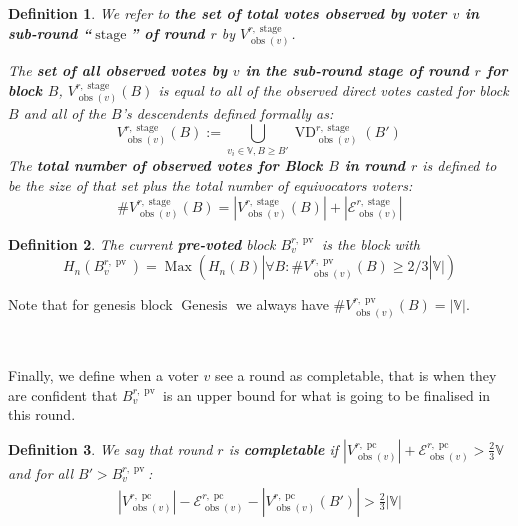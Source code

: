 \documentclass{book}
\newcommand{\assign}{:=}
\newcommand{\nosymbol}{}
\newcommand{\tmop}[1]{\ensuremath{\operatorname{#1}}}
\newcommand{\tmstrong}[1]{\textbf{#1}}
\newcommand{\tmtextbf}[1]{{\bfseries{#1}}}
\newtheorem{definition}{Definition}
\providecommand{\nosymbol}{}
\providecommand{\tmop}[1]{\ensuremath{\mathrm{#1}}}
\providecommand{\tmstrong}[1]{\tmtextbf{#1}}
\providecommand{\tmtextbf}[1]{\tmtextbf{#1}}
\newtheorem{definition}{Definition}
\begin{document}
\begin{definition}
  We refer to {\tmstrong{the set of total votes observed by voter $v$ in
  sub-round ``$\tmop{stage}$'' of round $r$}} by {\tmstrong{$V^{r,
  \tmop{stage}}_{\tmop{obs} (v)}^{\nosymbol}_{\nosymbol}$}}.
  
  The {\tmstrong{set of all observed votes by $v$ in the sub-round stage of
  round $r$ for block $B$}}, {\tmstrong{$V^{r, \tmop{stage}}_{\tmop{obs} (v)}
  (B)$}} is equal to all of the observed direct votes casted for block $B$ and
  all of the $B$'s descendents defined formally as:
  \[ V^{r, \tmop{stage}}_{\tmop{obs} (v)} (B) \assign \bigcup_{v_i \in
     \mathbb{V}, B \geqslant B'} \tmop{VD}^{r, \tmop{stage}}_{\tmop{obs} (v)}
     (B')_{\nosymbol}^{\nosymbol}_{\nosymbol} \]
  The {\tmstrong{total number of observed votes for Block $B$ in round $r$}}
  is defined to be the size of that set plus the total number of equivocators
  voters:
  \[ \#V^{r, \tmop{stage}}_{\tmop{obs} (v)} (B) = |V^{r,
     \tmop{stage}}_{\tmop{obs} (v)} (B) | + | \mathcal{E}^{r,
     \tmop{stage}}_{\tmop{obs} (v)} | \]
\end{definition}

\begin{definition}
  The current {\tmstrong{pre-voted}} block $B^{r, \tmop{pv}}_v$ is the block
  with
  \[ H_n (B^{r, \tmop{pv}}_v) = \tmop{Max} (H_n (B) | \forall B :
     \#V_{\tmop{obs} (v)}^{r, \tmop{pv}} (B) \geqslant 2 / 3|\mathbb{V}|) \]
\end{definition}

Note that for genesis block $\tmop{Genesis}$ we always have $\#V_{\tmop{obs}
(v)}^{r, \tmop{pv}} (B) = | \mathbb{V} |$.

\

Finally, we define when a voter $v$ see a round as completable, that is when
they are confident that $B_v^{r, \tmop{pv}}$ is an upper bound for what is
going to be finalised in this round. \

\begin{definition}
  \label{defn-grandpa-completable}We say that round $r$ is
  {\tmstrong{completable}} if $|V^{r, \tmop{pc}}_{\tmop{obs} (v)} |
  +\mathcal{E}^{r, \tmop{pc}}_{\tmop{obs} (v)} > \frac{2}{3} \mathbb{V}$ and
  for all $B' > B_v^{r, \tmop{pv}}$:
  \[ \begin{array}{l}
       |V^{r, \tmop{pc}}_{\tmop{obs} (v)} | -\mathcal{E}^{r,
       \tmop{pc}}_{\tmop{obs} (v)} - |V^{r, \tmop{pc}}_{\tmop{obs}
       (v)_{\nosymbol}} (B') | > \frac{2}{3} |\mathbb{V}|
     \end{array} \]
\end{definition}
\end{document}
